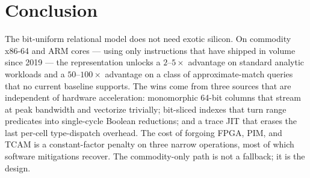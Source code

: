 \documentclass[10pt]{article}
\theoremstyle{definition}
\begin{document}
\section{Conclusion}

The bit-uniform relational model does not need exotic silicon. On commodity x86-64 and ARM cores --- using only instructions that have shipped in volume since 2019 --- the representation unlocks a $2$--$5\times$ advantage on standard analytic workloads and a $50$--$100\times$ advantage on a class of approximate-match queries that no current baseline supports. The wins come from three sources that are independent of hardware acceleration: monomorphic 64-bit columns that stream at peak bandwidth and vectorize trivially; bit-sliced indexes that turn range predicates into single-cycle Boolean reductions; and a trace JIT that erases the last per-cell type-dispatch overhead. The cost of forgoing FPGA, PIM, and TCAM is a constant-factor penalty on three narrow operations, most of which software mitigations recover. The commodity-only path is not a fallback; it is the design.
\end{document}

